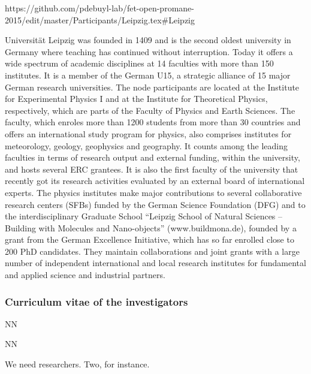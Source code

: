 \begin{sitedescription}https://github.com/pdebuyl-lab/fet-open-promane-2015/edit/master/Participants/Leipzig.tex#{Leipzig} \label{desc:Leipzig}

 Universität Leipzig was founded in 1409 and is the second oldest university in Germany where teaching has continued without interruption. 
  Today it offers a wide spectrum of academic disciplines at 14 faculties with more than 150 institutes. 
  It is a member of the German U15, a strategic alliance of 15 major German research universities. 
  The node participants are located at the Institute for Experimental Physics I and at the Institute for Theoretical Physics, respectively, which are parts of the Faculty of Physics and Earth Sciences. 
  The faculty, which enroles more than 1200 students from more than 30 countries and offers an international study program for physics, also comprises institutes for meteorology, geology, geophysics and geography. 
  It counts among the leading faculties in terms of research output and external funding, within the university, and hosts several ERC grantees. 
  It is also the first faculty of the university that recently got its research activities evaluated by an external board of international experts. 
  The physics institutes make major contributions to several collaborative research centers (SFBs) funded by the German Science Foundation (DFG) and to the interdisciplinary Graduate School ``Leipzig School of Natural Sciences -- Building with Molecules and Nano-objects'' (www.buildmona.de), founded by a grant from the German Excellence Initiative, which has so far enrolled close to 200 PhD candidates. 
  They maintain collaborations and joint grants with a large number of independent international and local research institutes for fundamental and applied science and industrial partners. 

\subsubsection*{Curriculum vitae of the investigators}




\begin{participant}[type=res,PM=48,salary=5500]{NN}
\end{participant}
\begin{participant}[type=res,PM=36,salary=5500]{NN}

We need researchers. Two, for instance.


\end{participant}
\end{sitedescription}
